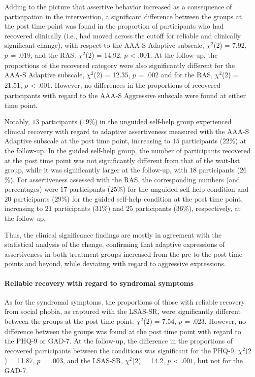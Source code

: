 \documentclass[preprint,
3p]{elsarticle} %
\begin{document}
Adding to the picture that assertive behavior increased as a consequence
of participation in the intervention, a significant difference between
the groups at the post time point was found in the proportion of
participants who had recovered clinically (i.e., had moved across the
cutoff for reliable and clinically significant change), with respect to
the AAA-S Adaptive subscale, \(\chi^2\)(\(2\)) = 7.92, \(p_{ }\) =
\(.019\), and the RAS, \(\chi^2\)(\(2\)) = 14.92, \(p_{ }\) \textless{}
\(.001\). At the follow-up, the proportions of the recovered category
were also significantly different for the AAA-S Adaptive subscale,
\(\chi^2\)(\(2\)) = 12.35, \(p_{ }\) = \(.002\) and for the RAS,
\(\chi^2\)(\(2\)) = 21.51, \(p_{ }\) \textless{} \(.001\). However, no
differences in the proportions of recovered participants with regard to
the AAA-S Aggressive subscale were found at either time point.

Notably, \(13\) participants (\(19\)\%) in the unguided self-help group
experienced clinical recovery with regard to adaptive assertiveness
measured with the AAA-S Adaptive subscale at the post time point,
increasing to \(15\) participants (\(22\)\%) at the follow-up. In the
guided self-help group, the number of participants recovered at the post
time point was not significantly different from that of the wait-list
group, while it was significantly larger at the follow-up, with \(18\)
participants (\(26\)\%). For assertiveness assessed with the RAS, the
corresponding numbers (and percentages) were \(17\) participants
(\(25\)\%) for the unguided self-help condition and \(20\) participants
(\(29\)\%) for the guided self-help condition at the post time point,
increasing to \(21\) participants (\(31\)\%) and \(25\) participants
(\(36\)\%), respectively, at the follow-up.

Thus, the clinical significance findings are mostly in agreement with
the statistical analysis of the change, confirming that adaptive
expressions of assertiveness in both treatment groups increased from the
pre to the post time points and beyond, while deviating with regard to
aggressive expressions.

\hypertarget{reliable-recovery-with-regard-to-syndromal-symptoms}{%
\paragraph{Reliable recovery with regard to syndromal
symptoms}\label{reliable-recovery-with-regard-to-syndromal-symptoms}}

As for the syndromal symptoms, the proportions of those with reliable
recovery from social phobia, as captured with the LSAS-SR, were
significantly different between the groups at the post time point,
\(\chi^2\)(\(2\)) = 7.54, \(p_{ }\) = \(.023\). However, no difference
between the groups was found at the post time point with regard to the
PHQ-9 or GAD-7. At the follow-up, the difference in the proportions of
recovered participants between the conditions was significant for the
PHQ-9, \(\chi^2\)(\(2\)) = 11.87, \(p_{ }\) = \(.003\), and the LSAS-SR,
\(\chi^2\)(\(2\)) = 14.2, \(p_{ }\) \textless{} \(.001\), but not for
the GAD-7.
\end{document}

